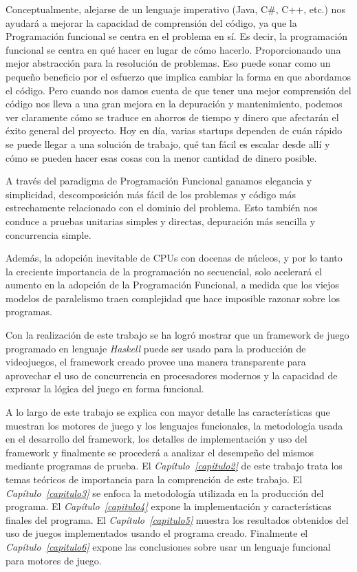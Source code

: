 Conceptualmente, alejarse de un lenguaje imperativo (Java, C\#, C++, etc.) nos ayudará a mejorar la capacidad de comprensión del código, ya que la Programación funcional se centra en el problema en sí. Es decir, la programación funcional se centra en qué hacer en lugar de cómo hacerlo. Proporcionando una mejor abstracción para la resolución de problemas. Eso puede sonar como un pequeño beneficio por el esfuerzo que implica cambiar la forma en que abordamos el código. Pero cuando nos damos cuenta de que tener una mejor comprensión del código nos lleva a una gran mejora en la depuración y mantenimiento, podemos ver claramente cómo se traduce en ahorros de tiempo y dinero que afectarán el éxito general del proyecto. Hoy en día, varias startups dependen de cuán rápido se puede llegar a una solución de trabajo, qué tan fácil es escalar desde allí y cómo se pueden hacer esas cosas con la menor cantidad de dinero posible.

A través del paradigma de Programación Funcional ganamos elegancia y simplicidad, descomposición más fácil de los problemas y código más estrechamente relacionado con el dominio del problema. Esto también nos conduce a pruebas unitarias simples y directas, depuración más sencilla y concurrencia simple.

Además, la adopción inevitable de CPUs con docenas de núcleos, y por lo tanto la creciente importancia de la programación no secuencial, solo acelerará el aumento en la adopción de la Programación Funcional, a medida que los viejos modelos de paralelismo traen complejidad que hace imposible razonar sobre los programas.

Con la realización de este trabajo se ha logró mostrar que un framework de juego programado en lenguaje \emph{Haskell} puede ser usado para la producción de videojuegos, el framework creado provee una manera transparente para aprovechar el uso de concurrencia en procesadores modernos y la capacidad de expresar la lógica del juego en forma funcional.

A lo largo de este trabajo se explica con mayor detalle las características que muestran los motores de juego y los lenguajes funcionales, la metodología usada en el desarrollo del framework, los detalles de implementación y uso del framework y finalmente se procederá a analizar el desempeño del mismos mediante programas de prueba. El \emph{Capítulo~\ref{capitulo2}} de este trabajo trata los temas teóricos de importancia para la comprención de este trabajo. El \emph{Capítulo~\ref{capitulo3}} se enfoca la metodología utilizada en la producción del programa. El \emph{Capítulo~\ref{capitulo4}} expone la implementación y características finales del programa. El \emph{Capítulo~\ref{capitulo5}} muestra los resultados obtenidos del uso de juegos implementados usando el programa creado. Finalmente el \emph{Capítulo~\ref{capitulo6}} expone las conclusiones sobre usar un lenguaje funcional para motores de juego.
